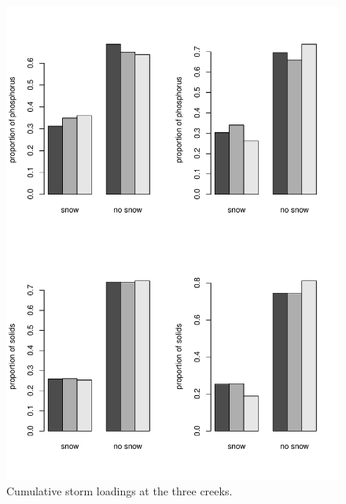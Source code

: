 \documentclass[12pt]{article}
\begin{document}
\begin{figure}[h!]
    \begin{center}
\includegraphics{loadings-fig3}
    \end{center}
    \vspace{-10mm}
    \caption{Cumulative storm loadings at the three creeks.\label{bars2}}
\end{figure}
\end{document}
